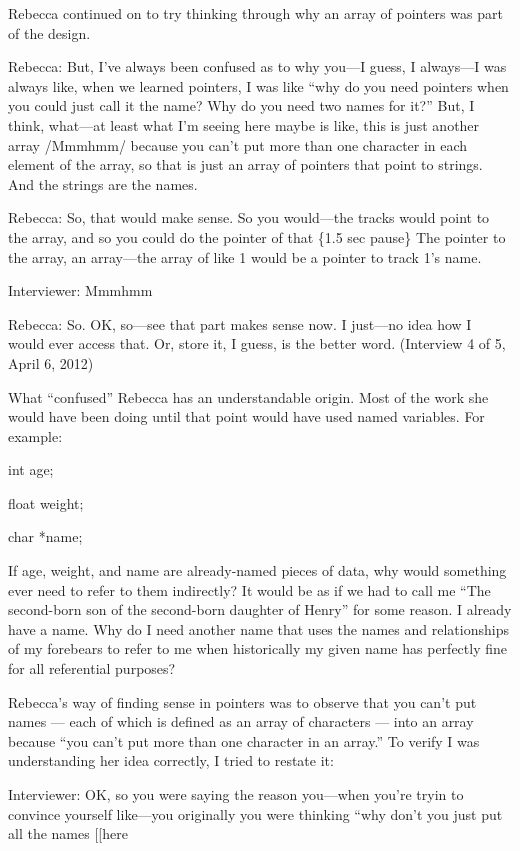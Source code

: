 Rebecca continued on to try thinking through why an array of pointers
was part of the design.

Rebecca: But, I've always been confused as to why you---I guess, I
always---I was always like, when we learned pointers, I was like ``why
do you need pointers when you could just call it the name? Why do you
need two names for it?'' But, I think, what---at least what I'm seeing
here maybe is like, this is just another array /Mmmhmm/ because you
can't put more than one character in each element of the array, so that
is just an array of pointers that point to strings. And the strings are
the names.

Rebecca: So, that would make sense. So you would---the tracks would
point to the array, and so you could do the pointer of that \{1.5 sec
pause\} The pointer to the array, an array---the array of like 1 would
be a pointer to track 1's name.

Interviewer: Mmmhmm

Rebecca: So. OK, so---see that part makes sense now. I just---no idea
how I would ever access that. Or, store it, I guess, is the better word.
(Interview 4 of 5, April 6, 2012)

What ``confused'' Rebecca has an understandable origin. Most of the work
she would have been doing until that point would have used named
variables. For example:

int age;

float weight;

char *name;

If age, weight, and name are already-named pieces of data, why would
something ever need to refer to them indirectly? It would be as if we
had to call me ``The second-born son of the second-born daughter of
Henry'' for some reason. I already have a name. Why do I need another
name that uses the names and relationships of my forebears to refer to
me when historically my given name has perfectly fine for all
referential purposes?

Rebecca's way of finding sense in pointers was to observe that you can't
put names --- each of which is defined as an array of characters ---
into an array because ``you can't put more than one character in an
array.'' To verify I was understanding her idea correctly, I tried to
restate it:

Interviewer: OK, so you were saying the reason you---when you're tryin
to convince yourself like---you originally you were thinking ``why don't
you just put all the names {[}{[}here

